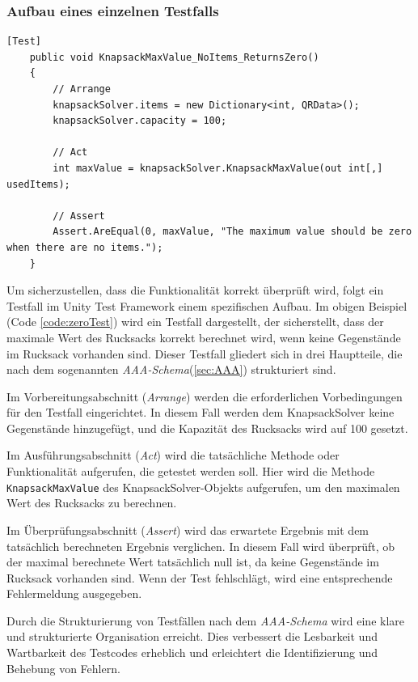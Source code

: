 \begin{itemize}
\subsubsection{Aufbau eines einzelnen Testfalls}

\begin{lstlisting}[style=csharp, caption={einzelner Testfall}, label={code:zeroTest}]
    [Test]
    public void KnapsackMaxValue_NoItems_ReturnsZero()
    {
        // Arrange
        knapsackSolver.items = new Dictionary<int, QRData>();
        knapsackSolver.capacity = 100;

        // Act
        int maxValue = knapsackSolver.KnapsackMaxValue(out int[,] usedItems);

        // Assert
        Assert.AreEqual(0, maxValue, "The maximum value should be zero when there are no items.");
    }
\end{lstlisting}

Um sicherzustellen, dass die Funktionalität korrekt überprüft wird, folgt ein Testfall im Unity Test Framework einem spezifischen Aufbau. Im obigen Beispiel (Code \ref{code:zeroTest}) wird ein Testfall dargestellt, der sicherstellt, dass der maximale Wert des Rucksacks korrekt berechnet wird, wenn keine Gegenstände im Rucksack vorhanden sind. Dieser Testfall gliedert sich in drei Hauptteile, die nach dem sogenannten \textit{AAA-Schema}(\ref{sec:AAA}) strukturiert sind.

Im Vorbereitungsabschnitt (\textit{Arrange}) werden die erforderlichen Vorbedingungen für den Testfall eingerichtet. In diesem Fall werden dem KnapsackSolver keine Gegenstände hinzugefügt, und die Kapazität des Rucksacks wird auf 100 gesetzt.

Im Ausführungsabschnitt (\textit{Act}) wird die tatsächliche Methode oder Funktionalität aufgerufen, die getestet werden soll. Hier wird die Methode \texttt{KnapsackMaxValue} des KnapsackSolver-Objekts aufgerufen, um den maximalen Wert des Rucksacks zu berechnen.

Im Überprüfungsabschnitt (\textit{Assert}) wird das erwartete Ergebnis mit dem tatsächlich berechneten Ergebnis verglichen. In diesem Fall wird überprüft, ob der maximal berechnete Wert tatsächlich null ist, da keine Gegenstände im Rucksack vorhanden sind. Wenn der Test fehlschlägt, wird eine entsprechende Fehlermeldung ausgegeben.

Durch die Strukturierung von Testfällen nach dem \textit{AAA-Schema} wird eine klare und strukturierte Organisation erreicht. Dies verbessert die Lesbarkeit und Wartbarkeit des Testcodes erheblich und erleichtert die Identifizierung und Behebung von Fehlern.


\end{itemize}
